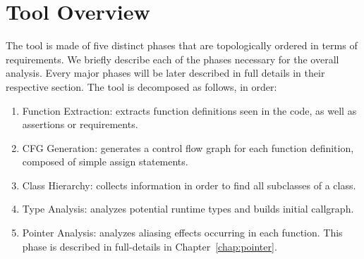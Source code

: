 \chapter{Tool Overview}
\label{chap:overview}
The tool is made of five distinct phases that are topologically ordered in terms
of requirements. We briefly describe each of the phases necessary for the
overall analysis. Every major phases will be later described in full details in
their respective section.
The tool is decomposed as follows, in order:
\begin{enumerate}
    \item{Function Extraction}: extracts function definitions seen in the code, as well as
    assertions or requirements.

    \item{CFG Generation}: generates a control flow graph for each function
    definition, composed of simple assign statements.

    \item{Class Hierarchy}: collects information in order to find all subclasses of a class.

    \item{Type Analysis}: analyzes potential runtime types and builds initial callgraph.

    \item{Pointer Analysis}: analyzes aliasing effects occurring in each
    function. This phase is described in full-details in
    Chapter~\ref{chap:pointer}.
\end{enumerate}
